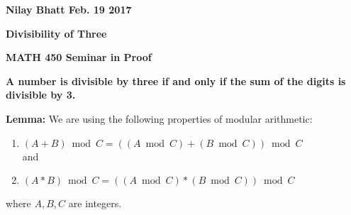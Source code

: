 \documentclass[12pt, fullpage]{article}
\begin{document}
\begin{flushleft}
\textbf{Nilay Bhatt Feb. 19 2017}		
\end{flushleft}

\begin{center}
	\textbf{Divisibility of Three}
\end{center}

\begin{center}
		
{\bf MATH 450 Seminar in Proof}
 \\
\end{center}

\begin{center}
\textbf{A number is divisible by three if and only if the sum of the digits is divisible by 3.}
\end{center}
\textbf{Lemma: }We are using the following properties of modular arithmetic:
\begin{enumerate}
\item
	$(A + B) \bmod C = ((A \bmod C) + (B \bmod C)) \bmod C$
	\\and
\item
	$(A * B) \bmod C = ((A \bmod C) * (B \bmod C)) \bmod C$
\end{enumerate}
where $A,B,C$ are integers.
\end{document}
